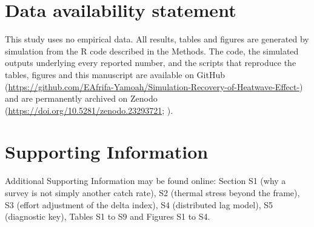 \documentclass[11pt,a4paper]{article}
\begin{document}
\section*{Data availability statement}
This study uses no empirical data. All results, tables and figures are generated by simulation from the R code described in the Methods. The code, the simulated outputs underlying every reported number, and the scripts that reproduce the tables, figures and this manuscript are available on GitHub (\url{https://github.com/EAfrifa-Yamoah/Simulation-Recovery-of-Heatwave-Effect-}) and are permanently archived on Zenodo (\url{https://doi.org/10.5281/zenodo.23293721}; \citealp{awuah2026}).

\section*{Supporting Information}
Additional Supporting Information may be found online: Section S1 (why a survey is not simply another catch rate), S2 (thermal stress beyond the frame), S3 (effort adjustment of the delta index), S4 (distributed lag model), S5 (diagnostic key), Tables S1 to S9 and Figures S1 to S4.

\end{document}
